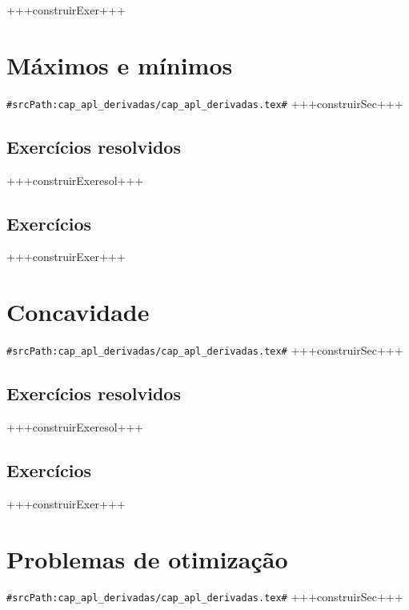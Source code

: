 +++construirExer+++


\section{Máximos e mínimos}
\verb+#srcPath:cap_apl_derivadas/cap_apl_derivadas.tex#+
+++construirSec+++

\subsection*{Exercícios resolvidos}

+++construirExeresol+++


\subsection*{Exercícios}

+++construirExer+++



\section{Concavidade}
\verb+#srcPath:cap_apl_derivadas/cap_apl_derivadas.tex#+
+++construirSec+++

\subsection*{Exercícios resolvidos}

+++construirExeresol+++


\subsection*{Exercícios}

+++construirExer+++


\section{Problemas de otimização}
\verb+#srcPath:cap_apl_derivadas/cap_apl_derivadas.tex#+
+++construirSec+++


